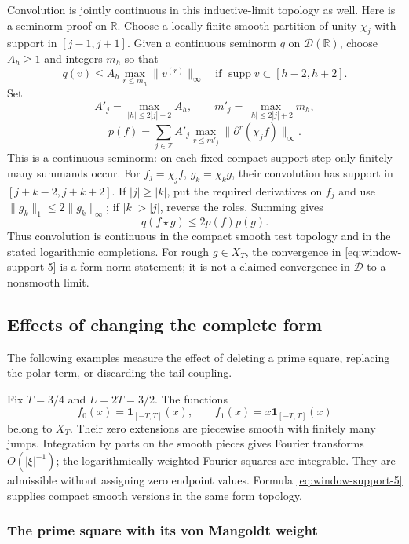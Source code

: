 Convolution is jointly continuous in this inductive-limit
topology as well.  Here is a seminorm proof on $\mathbb R$.
Choose a locally finite smooth partition of unity $\chi_j$
with support in $[j-1,j+1]$.  Given a continuous seminorm $q$
on $\mathcal D(\mathbb R)$, choose $A_h\ge1$ and integers
$m_h$ so that
\[
 q(v)\le A_h\max_{r\le m_h}\|v^{(r)}\|_\infty
       \quad\text{if }\operatorname{supp}v\subset[h-2,h+2].
\]
Set
\[
 A'_j=\max_{|h|\le2|j|+2}A_h,\qquad
 m'_j=\max_{|h|\le2|j|+2}m_h,
\]
\[
 p(f)=\sum_{j\in\mathbb Z}A'_j
           \max_{r\le m'_j}\|\partial^r(\chi_jf)\|_\infty.
\]
This is a continuous seminorm: on each fixed compact-support
step only finitely many summands occur.  For
$f_j=\chi_jf$, $g_k=\chi_kg$, their convolution has support
in $[j+k-2,j+k+2]$.  If $|j|\ge|k|$, put the required
derivatives on $f_j$ and use $\|g_k\|_1\le2\|g_k\|_\infty$;
if $|k|>|j|$, reverse the roles.  Summing gives
\begin{equation}
 q(f\star g)\le2p(f)p(g).
 \label{eq:window-support-7}
\end{equation}
Thus convolution is continuous in the compact smooth test topology
and in the stated logarithmic completions.
For rough $g\in X_T$, the convergence in \eqref{eq:window-support-5} is a form-norm
statement; it is not a claimed convergence in $\mathcal D$ to a
nonsmooth limit.

\subsection{Effects of changing the complete form}
\label{sec:window-term-differences}

The following examples measure the effect of deleting a prime square,
replacing the polar term, or discarding the tail coupling.

Fix $T=3/4$ and $L=2T=3/2$.  The functions
\[
 f_0(x)=\mathbf1_{[-T,T]}(x),\qquad
 f_1(x)=x\mathbf1_{[-T,T]}(x)
\]
belong to $X_T$.  Their zero extensions are piecewise smooth with finitely many jumps.  Integration by parts
on the smooth pieces gives Fourier transforms $O(|\xi|^{-1})$; the
logarithmically weighted Fourier squares are integrable.
They are admissible without assigning zero endpoint values.
Formula \eqref{eq:window-support-5} supplies compact smooth versions in the same form
topology.

\subsubsection{The prime square with its von Mangoldt weight}

